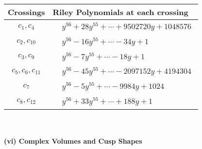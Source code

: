 \documentclass[1p]{elsarticle_modified}
\theoremstyle{definition}
\begin{document}
\begin{tabular}{m{50pt}|m{274pt}}
Crossings & \hspace{64pt}Riley Polynomials at each crossing \\
\hline $$\begin{aligned}c_{1},c_{4}\end{aligned}$$&$\begin{aligned}
&y^{56}+28 y^{55}+\cdots+9502720 y+1048576
\end{aligned}$\\
\hline $$\begin{aligned}c_{2},c_{10}\end{aligned}$$&$\begin{aligned}
&y^{56}-16 y^{55}+\cdots-34 y+1
\end{aligned}$\\
\hline $$\begin{aligned}c_{3},c_{9}\end{aligned}$$&$\begin{aligned}
&y^{56}-7 y^{55}+\cdots-18 y+1
\end{aligned}$\\
\hline $$\begin{aligned}c_{5},c_{6},c_{11}\end{aligned}$$&$\begin{aligned}
&y^{56}-45 y^{55}+\cdots-2097152 y+4194304
\end{aligned}$\\
\hline $$\begin{aligned}c_{7}\end{aligned}$$&$\begin{aligned}
&y^{56}-5 y^{55}+\cdots-9984 y+1024
\end{aligned}$\\
\hline $$\begin{aligned}c_{8},c_{12}\end{aligned}$$&$\begin{aligned}
&y^{56}+33 y^{55}+\cdots+188 y+1
\end{aligned}$\\
\hline
\end{tabular}\\~\\
\newpage\flushleft \textbf{(vi) Complex Volumes and Cusp Shapes}
\end{document}
